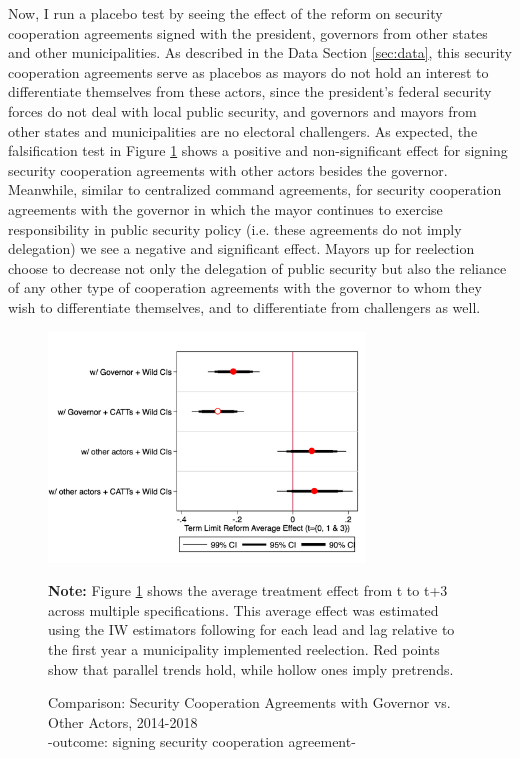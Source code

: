 \documentclass[12pt]{amsart}
\numberwithin{equation}{section}
\theoremstyle{definition}
\theoremstyle{definition}
\theoremstyle{definition}
\begin{document}
Now, I run a placebo test by seeing the effect of the reform on security cooperation agreements signed with the president, governors from other states and other municipalities. As described in the Data Section \ref{sec:data}, this security cooperation agreements serve as placebos as mayors do not hold an interest to differentiate themselves from these actors,  since the president's federal security forces do not deal with local public security, and governors and mayors from other states and municipalities are no electoral challengers. As expected, the falsification test in Figure \ref{fig:comparison_fed_estatal} shows a positive and non-significant effect for signing security cooperation agreements with other actors besides the governor. Meanwhile, similar to centralized command agreements, for security cooperation agreements with the governor in which the mayor continues to exercise responsibility in public security policy (i.e. these agreements do not imply delegation) we see a negative and significant effect. Mayors up for reelection choose to decrease not only the delegation of public security but also the reliance of any other type of cooperation agreements with the governor to whom they wish to differentiate themselves, and to differentiate from challengers as well.    
  
 \begin{figure}[h]   
\centering
 \caption{Comparison: Security Cooperation Agreements with Governor vs. Other Actors, 2014-2018 \\ -outcome: signing security cooperation agreement-}
 \label{fig:comparison_fed_estatal}
\includegraphics[width=0.75\textwidth]{Figures/average_effects_comparisonfedest.png}
       \captionsetup{justification=centering}
       
 \textbf{Note:} Figure \ref{fig:comparison_fed_estatal} shows the average treatment effect from t to t+3 across multiple specifications. This average effect was estimated using the IW estimators following \citet{abraham_sun_2020} for each lead and lag relative to the first year a municipality implemented reelection. Red points show that parallel trends hold, while hollow ones imply pretrends. 
\end{figure}   
\end{document}
